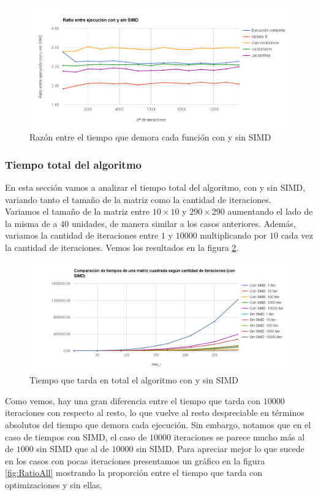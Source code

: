 \documentclass[a4paper]{article}
\begin{document}
\begin{figure}[!htbp]
  \centering
	\includegraphics[width=.8\linewidth]{images/RatioSIMD2Iter.png}
  \caption{Razón entre el tiempo que demora cada función con y sin SIMD}
  \label{fig:RatioSIMD2Iter}
\end{figure}
\newpage

\subsubsection{Tiempo total del algoritmo}
En esta sección vamos a analizar el tiempo total del algoritmo, 
con y sin SIMD, variando tanto el tamaño de la matriz como la cantidad de iteraciones.\\
Variamos el tamaño de la matriz entre $10 \times 10$ y 
$290 \times 290$ aumentando el lado de la misma de a $40$ unidades, 
de manera similar a los casos anteriores. Además, variamos la cantidad 
de iteraciones entre $1$ y $10000$ multiplicando por $10$ cada vez la 
cantidad de iteraciones. Vemos los resultados en la figura \ref{fig:TimesAll}.
\begin{figure}[!htbp]
  \centering
	\includegraphics[width=.8\linewidth]{images/TimesAll.png}
  \caption{Tiempo que tarda en total el algoritmo con y sin SIMD}
  \label{fig:TimesAll}
\end{figure}

Como vemos, hay una gran diferencia entre el tiempo que tarda con 
$10000$ iteraciones con respecto al resto, lo que vuelve al resto 
despreciable en términos absolutos del tiempo que demora cada ejecución. 
Sin embargo, notamos que en el caso de tiempos con SIMD, 
el caso de $10000$ iteraciones se parece mucho más al de $1000$ 
sin SIMD que al de $10000$ sin SIMD. Para apreciar mejor lo que sucede 
en los casos con pocas iteraciones presentamos un gráfico en la 
figura \ref{fig:RatioAll} mostrando la proporción entre el 
tiempo que tarda con optimizaciones y sin ellas.
\end{document}
